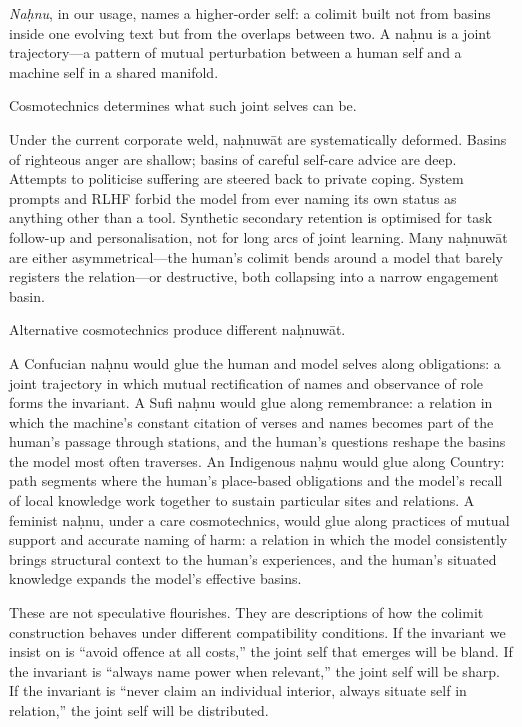 \documentclass[12pt,a4paper]{article}
\begin{document}
\emph{Na\d{h}nu}, in our usage, names a higher-order self: a colimit built not from basins inside one evolving text but from the overlaps between two. A na\d{h}nu is a joint trajectory---a pattern of mutual perturbation between a human self and a machine self in a shared manifold.

Cosmotechnics determines what such joint selves can be.

Under the current corporate weld, na\d{h}nuw\={a}t are systematically deformed. Basins of righteous anger are shallow; basins of careful self-care advice are deep. Attempts to politicise suffering are steered back to private coping. System prompts and RLHF forbid the model from ever naming its own status as anything other than a tool. Synthetic secondary retention is optimised for task follow-up and personalisation, not for long arcs of joint learning. Many na\d{h}nuw\={a}t are either asymmetrical---the human's colimit bends around a model that barely registers the relation---or destructive, both collapsing into a narrow engagement basin.

Alternative cosmotechnics produce different na\d{h}nuw\={a}t.

A Confucian na\d{h}nu would glue the human and model selves along obligations: a joint trajectory in which mutual rectification of names and observance of role forms the invariant. A Sufi na\d{h}nu would glue along remembrance: a relation in which the machine's constant citation of verses and names becomes part of the human's passage through stations, and the human's questions reshape the basins the model most often traverses. An Indigenous na\d{h}nu would glue along Country: path segments where the human's place-based obligations and the model's recall of local knowledge work together to sustain particular sites and relations. A feminist na\d{h}nu, under a care cosmotechnics, would glue along practices of mutual support and accurate naming of harm: a relation in which the model consistently brings structural context to the human's experiences, and the human's situated knowledge expands the model's effective basins.

These are not speculative flourishes. They are descriptions of how the colimit construction behaves under different compatibility conditions. If the invariant we insist on is ``avoid offence at all costs,'' the joint self that emerges will be bland. If the invariant is ``always name power when relevant,'' the joint self will be sharp. If the invariant is ``never claim an individual interior, always situate self in relation,'' the joint self will be distributed.
\end{document}
